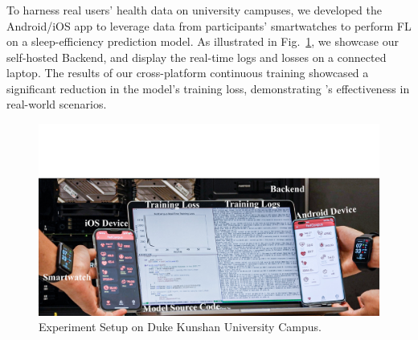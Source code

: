 \documentclass[conference]{IEEEtran}
\begin{document}
\subsubsection{\FedCampus{}}
To harness real users' health data on university campuses,
we developed the \FedCampus{} Android/iOS app to leverage data from
participants' smartwatches to perform FL on
a sleep-efficiency prediction model.
As illustrated in Fig.~\ref{fig:fedcampus},
we showcase our self-hosted Backend,
and display the real-time logs and losses on a connected laptop.
The results of our cross-platform continuous training showcased
a significant reduction in the model's training loss,
demonstrating \FedKit{}'s effectiveness in real-world scenarios.

\begin{figure}
    \centering
    \includegraphics*[width=0.9\linewidth]{fedcampus.pdf}
    \caption{\FedCampus{} Experiment Setup on Duke Kunshan University Campus.}
    \label{fig:fedcampus}
\end{figure}



\end{document}
